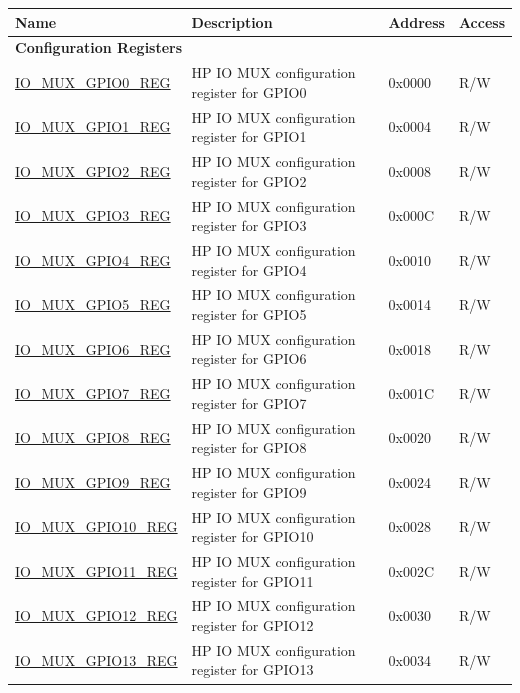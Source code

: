 \begin{longtable}{ | p{6cm} | p{7.2cm} | p{1.3cm} | p{1cm} | }
\hline\rowcolor{lightgray}
\textbf{Name} & \textbf{Description} &  \textbf{Address} & \textbf{Access} \\ \hline
\endhead
\multicolumn{4}{|l|}{\textbf{Configuration Registers}} \\ \hline
\hyperref[regdesc:IOMUXGPIONREG]{IO\_MUX\_GPIO0\_REG} & HP IO MUX configuration register for GPIO0 & 0x0000 & R/W \\ \hline
\hyperref[regdesc:IOMUXGPIONREG]{IO\_MUX\_GPIO1\_REG} & HP IO MUX configuration register for GPIO1 & 0x0004 & R/W \\ \hline
\hyperref[regdesc:IOMUXGPIONREG]{IO\_MUX\_GPIO2\_REG} & HP IO MUX configuration register for GPIO2 & 0x0008 & R/W \\ \hline
\hyperref[regdesc:IOMUXGPIONREG]{IO\_MUX\_GPIO3\_REG} & HP IO MUX configuration register for GPIO3 & 0x000C & R/W \\ \hline
\hyperref[regdesc:IOMUXGPIONREG]{IO\_MUX\_GPIO4\_REG} & HP IO MUX configuration register for GPIO4 & 0x0010 & R/W \\ \hline
\hyperref[regdesc:IOMUXGPIONREG]{IO\_MUX\_GPIO5\_REG} & HP IO MUX configuration register for GPIO5 & 0x0014 & R/W \\ \hline
\hyperref[regdesc:IOMUXGPIONREG]{IO\_MUX\_GPIO6\_REG} & HP IO MUX configuration register for GPIO6 & 0x0018 & R/W \\ \hline
\hyperref[regdesc:IOMUXGPIONREG]{IO\_MUX\_GPIO7\_REG} & HP IO MUX configuration register for GPIO7 & 0x001C & R/W \\ \hline
\hyperref[regdesc:IOMUXGPIONREG]{IO\_MUX\_GPIO8\_REG} & HP IO MUX configuration register for GPIO8 & 0x0020 & R/W \\ \hline
\hyperref[regdesc:IOMUXGPIONREG]{IO\_MUX\_GPIO9\_REG} & HP IO MUX configuration register for GPIO9 & 0x0024 & R/W \\ \hline
\hyperref[regdesc:IOMUXGPIONREG]{IO\_MUX\_GPIO10\_REG} & HP IO MUX configuration register for GPIO10 & 0x0028 & R/W \\ \hline
\hyperref[regdesc:IOMUXGPIONREG]{IO\_MUX\_GPIO11\_REG} & HP IO MUX configuration register for GPIO11 & 0x002C & R/W \\ \hline
\hyperref[regdesc:IOMUXGPIONREG]{IO\_MUX\_GPIO12\_REG} & HP IO MUX configuration register for GPIO12 & 0x0030 & R/W \\ \hline
\hyperref[regdesc:IOMUXGPIONREG]{IO\_MUX\_GPIO13\_REG} & HP IO MUX configuration register for GPIO13 & 0x0034 & R/W \\ \hline

\end{longtable}
